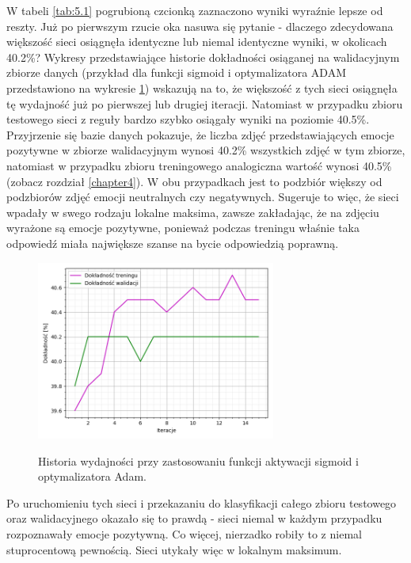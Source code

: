 W tabeli \ref{tab:5.1} pogrubioną czcionką zaznaczono wyniki wyraźnie lepsze od reszty. Już po pierwszym rzucie oka nasuwa się pytanie - dlaczego zdecydowana większość sieci osiągnęła identyczne lub niemal identyczne wyniki, w okolicach 40.2\%? Wykresy przedstawiające historie dokładności osiąganej na walidacyjnym zbiorze danych (przykład dla funkcji sigmoid i optymalizatora ADAM przedstawiono na wykresie \ref{pic:5.1}) wskazują na to, że większość z tych sieci osiągnęła tę wydajność już po pierwszej lub drugiej iteracji. Natomiast w przypadku zbioru testowego sieci z reguły bardzo szybko osiągały wyniki na poziomie 40.5\%. Przyjrzenie się bazie danych pokazuje, że liczba zdjęć przedstawiających emocje pozytywne w zbiorze walidacyjnym wynosi 40.2\% wszystkich zdjęć w tym zbiorze, natomiast w przypadku zbioru treningowego analogiczna wartość wynosi 40.5\% (zobacz rozdział \ref{chapter4}). W obu przypadkach jest to podzbiór większy od podzbiorów zdjęć emocji neutralnych czy negatywnych. Sugeruje to więc, że sieci wpadały w swego rodzaju lokalne maksima, zawsze zakładając, że na zdjęciu wyrażone są emocje pozytywne, ponieważ podczas treningu właśnie taka odpowiedź miała największe szanse na bycie odpowiedzią poprawną.

\begin{figure}[H]
    \caption{Historia wydajności przy zastosowaniu funkcji aktywacji sigmoid i optymalizatora Adam.}
    \centering
    \includegraphics[width=0.7\textwidth]{wykres1.png}
    \label{pic:5.1}
\end{figure}

Po uruchomieniu tych sieci i przekazaniu do klasyfikacji całego zbioru testowego oraz walidacyjnego okazało się to prawdą - sieci niemal w każdym przypadku rozpoznawały emocje pozytywną. Co więcej, nierzadko robiły to z niemal stuprocentową pewnością. Sieci utykały więc w lokalnym maksimum.

